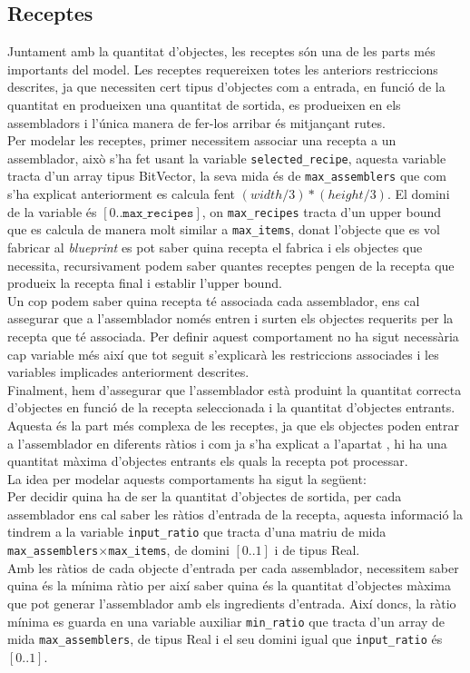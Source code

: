 \subsection{Receptes}
Juntament amb la quantitat d'objectes, les receptes són una de les parts més importants del model. Les receptes requereixen totes les anteriors restriccions descrites, ja que necessiten cert tipus d'objectes com a entrada, en funció de la quantitat en produeixen una quantitat de sortida, es produeixen en els assembladors i l'única manera de fer-los arribar és mitjançant rutes.\\

Per modelar les receptes, primer necessitem associar una recepta a un assemblador, això s'ha fet usant la variable \texttt{selected\_recipe}, aquesta variable tracta d'un array tipus BitVector, la seva mida és de \texttt{max\_assemblers} que com s'ha explicat anteriorment es calcula fent $(width/3) * (height/3)$. El domini de la variable és  $[0..\texttt{max\_recipes}]$, on \texttt{max\_recipes} tracta d'un upper bound que es calcula de manera molt similar a \texttt{max\_items}, donat l'objecte que es vol fabricar al \textit{blueprint} es pot saber quina recepta el fabrica i els objectes que necessita, recursivament podem saber quantes receptes pengen de la recepta que produeix la recepta final i establir l'upper bound.\\

Un cop podem saber quina recepta té associada cada assemblador, ens cal assegurar que a l'assemblador només entren i surten els objectes requerits per la recepta que té associada. Per definir aquest comportament no ha sigut necessària cap variable més així que tot seguit s'explicarà les restriccions associades i les variables implicades anteriorment descrites.\\

Finalment, hem d'assegurar que l'assemblador està produint la quantitat correcta d'objectes en funció de la recepta seleccionada i la quantitat d'objectes entrants. Aquesta és la part més complexa de les receptes, ja que els objectes poden entrar a l'assemblador en diferents ràtios i com ja s'ha explicat a l'apartat , hi ha una quantitat màxima d'objectes entrants els quals la recepta pot processar.\\
La idea per modelar aquests comportaments ha sigut la següent:\\
Per decidir quina ha de ser la quantitat d'objectes de sortida, per cada assemblador ens cal saber les ràtios d'entrada de la recepta, aquesta informació la tindrem a la variable \texttt{input\_ratio} que tracta d'una matriu de mida \texttt{max\_assemblers}$\times$\texttt{max\_items}, de domini $[0..1]$ i de tipus Real.\\
Amb les ràtios de cada objecte d'entrada per cada assemblador, necessitem saber quina és la mínima ràtio per així saber quina és la quantitat d'objectes màxima que pot generar l'assemblador amb els ingredients d'entrada. Així doncs, la ràtio mínima es guarda en una variable auxiliar \texttt{min\_ratio} que tracta d'un array de mida \texttt{max\_assemblers}, de tipus Real i el seu domini igual que \texttt{input\_ratio} és $[0..1]$.\\

